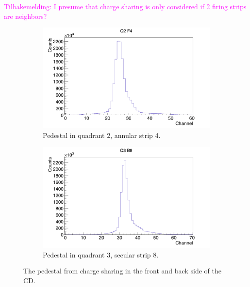 \documentclass[twoside,english]{uiofysmaster/uiofysmaster}
\begin{document}
\textcolor{Magenta}{Tilbakemelding: \newline 
I presume that charge sharing is only considered if 2 firing strips are neighbors?
}


%
%
%

\begin{figure}[ht]
	\centering
	\begin{subfigure}{\textwidth}
		\centering
		\includegraphics[width=\textwidth]{../Plots/plotting/Pedestal_Q2_f4.png}
		\caption{Pedestal in quadrant 2, annular strip 4.}
		\label{fig:Pedestal_f}
	\end{subfigure}
	\begin{subfigure}{\textwidth}
		\centering
		\includegraphics[width=\textwidth]{../Plots/plotting/Pedestal_Q3_b8.png}
		\caption{Pedestal in quadrant 3, secular strip 8.}
		\label{fig:Pedestal_b}
	\end{subfigure}
	\caption{The pedestal from charge sharing in the front and back side of the CD.}
	\label{fig:Pedestal}
\end{figure}
\end{document}
